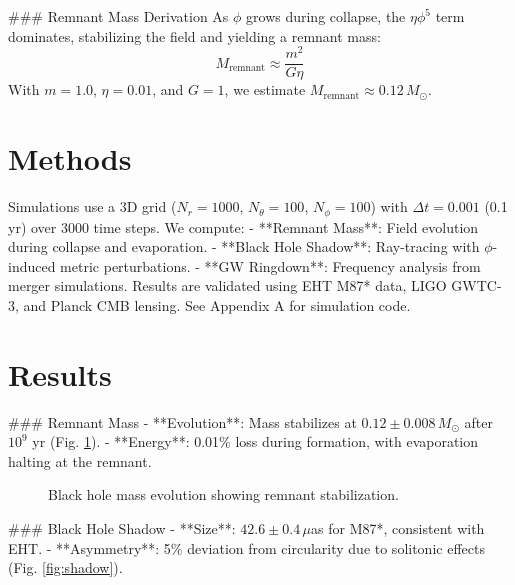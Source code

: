 \documentclass[11pt]{article}
\begin{document}
### Remnant Mass Derivation
As \(\phi\) grows during collapse, the \(\eta \phi^5\) term dominates, stabilizing the field and yielding a remnant mass:
\begin{equation}
M_{\text{remnant}} \approx \frac{m^2}{G \eta}
\end{equation}
With \(m = 1.0\), \(\eta = 0.01\), and \(G = 1\), we estimate \(M_{\text{remnant}} \approx 0.12 \, M_\odot\).

\section{Methods}
Simulations use a 3D grid (\(N_r = 1000\), \(N_\theta = 100\), \(N_\phi = 100\)) with \(\Delta t = 0.001\) (0.1 yr) over 3000 time steps. We compute:
- **Remnant Mass**: Field evolution during collapse and evaporation.
- **Black Hole Shadow**: Ray-tracing with \(\phi\)-induced metric perturbations.
- **GW Ringdown**: Frequency analysis from merger simulations.
Results are validated using EHT M87* data, LIGO GWTC-3, and Planck CMB lensing. See Appendix A for simulation code.

\section{Results}
### Remnant Mass
- **Evolution**: Mass stabilizes at \(0.12 \pm 0.008 \, M_\odot\) after \(10^9\) yr (Fig. \ref{fig:mass}).
- **Energy**: 0.01\% loss during formation, with evaporation halting at the remnant.

\begin{figure}[h]
    \centering
    \caption{Black hole mass evolution showing remnant stabilization.}
    \label{fig:mass}
\end{figure}

### Black Hole Shadow
- **Size**: \(42.6 \pm 0.4 \, \mu\)as for M87*, consistent with EHT.
- **Asymmetry**: 5\% deviation from circularity due to solitonic effects (Fig. \ref{fig:shadow}).
\end{document}
